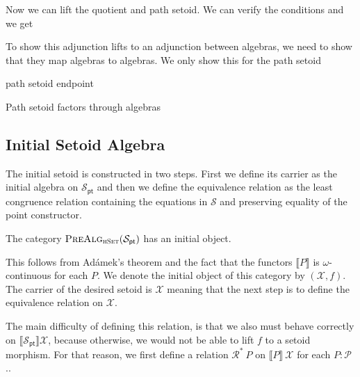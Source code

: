 \documentclass[9pt]{entcs}
\newcommand{\type}[1]{\textsc{#1}}
\newcommand{\category}[1]{\textsc{#1}}
\newcommand{\hset}{\type{hSet}} %
\newcommand{\0}{\textbf{0}} %
\newcommand{\1}{\textbf{1}} %
\newcommand{\poly}{\mathcal{P}} %
\newcommand{\pt}[0]{\textsf{pt}}
\newcommand{\pointc}[1]{#1_{\pt}} %
\newcommand{\sig}{\mathcal{S}} %
\newcommand{\semP}[1]{\llbracket #1 \rrbracket} %
\newcommand{\prealg}[1]{\category{PreAlg}_{\hset}(#1)} %
\newcommand{\CRC}{\mathcal{X}} %
\newcommand{\CR}{\mathcal{R}^*} %
\begin{document}
Now we can lift the quotient and path setoid.
We can verify the conditions and we get

To show this adjunction lifts to an adjunction between algebras, we need to show that they map algebras to algebras.
We only show this for the path setoid

\begin{lemma}
path setoid endpoint
\end{lemma}

\begin{lemma}
Path setoid factors through algebras
\end{lemma}

\subsection{Initial Setoid Algebra}
The initial setoid is constructed in two steps.
First we define its carrier as the initial algebra on $\pointc{\sig}$ and then we define the equivalence relation as the least congruence relation containing the equations in $\sig$ and preserving equality of the point constructor.

\begin{lemma}
The category $\prealg{\pointc{\sig}}$ has an initial object.
\end{lemma}

This follows from Ad\'amek's theorem and the fact that the functors $\semP{P}$ is $\omega$-continuous for each $P$.
We denote the initial object of this category by $(\CRC , f)$.
The carrier of the desired setoid is $\CRC$ meaning that the next step is to define the equivalence relation on $\CRC$.

The main difficulty of defining this relation, is that we also must behave correctly on $\semP{\pointc{\sig}}{\CRC}$, because otherwise, we would not be able to lift $f$ to a setoid morphism.
For that reason, we first define a relation $\CR \> P$ on $\semP{P} \> \CRC$ for each $P : \poly$..
\end{document}
